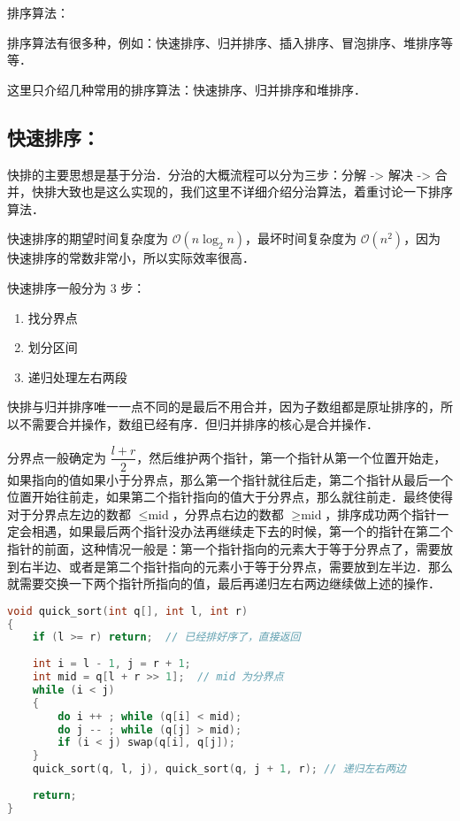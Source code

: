 
排序算法：

排序算法有很多种，例如：快速排序、归并排序、插入排序、冒泡排序、堆排序等等．

这里只介绍几种常用的排序算法：快速排序、归并排序和堆排序．

\subsection{快速排序：}

快排的主要思想是基于分治．分治的大概流程可以分为三步：分解 -> 解决 -> 合并，快排大致也是这么实现的，我们这里不详细介绍分治算法，着重讨论一下排序算法．

快速排序的期望时间复杂度为 $\mathcal{O}(n \log_2 n)$，最坏时间复杂度为 $\mathcal{O}(n^2)$，因为快速排序的常数非常小，所以实际效率很高．

快速排序一般分为 $3$ 步：
\begin{enumerate}
\item 找分界点
\item 划分区间
\item 递归处理左右两段
\end{enumerate}

快排与归并排序唯一一点不同的是最后不用合并，因为子数组都是原址排序的，所以不需要合并操作，数组已经有序．但归并排序的核心是合并操作．

分界点一般确定为 $\dfrac{l+r}{2}$，然后维护两个指针，第一个指针从第一个位置开始走，如果指向的值如果小于分界点，那么第一个指针就往后走，第二个指针从最后一个位置开始往前走，如果第二个指针指向的值大于分界点，那么就往前走．最终使得对于分界点左边的数都 $\leq \text{mid}$，分界点右边的数都 $\geq \text{mid}$，排序成功两个指针一定会相遇，如果最后两个指针没办法再继续走下去的时候，第一个的指针在第二个指针的前面，这种情况一般是：第一个指针指向的元素大于等于分界点了，需要放到右半边、或者是第二个指针指向的元素小于等于分界点，需要放到左半边．那么就需要交换一下两个指针所指向的值，最后再递归左右两边继续做上述的操作．


\begin{lstlisting}[language=cpp]
void quick_sort(int q[], int l, int r)
{
    if (l >= r) return;  // 已经排好序了，直接返回
		
    int i = l - 1, j = r + 1;
    int mid = q[l + r >> 1];  // mid 为分界点
    while (i < j)
    {
        do i ++ ; while (q[i] < mid);
        do j -- ; while (q[j] > mid);
        if (i < j) swap(q[i], q[j]);
    }
    quick_sort(q, l, j), quick_sort(q, j + 1, r); // 递归左右两边
    
    return;
}

\end{lstlisting}


